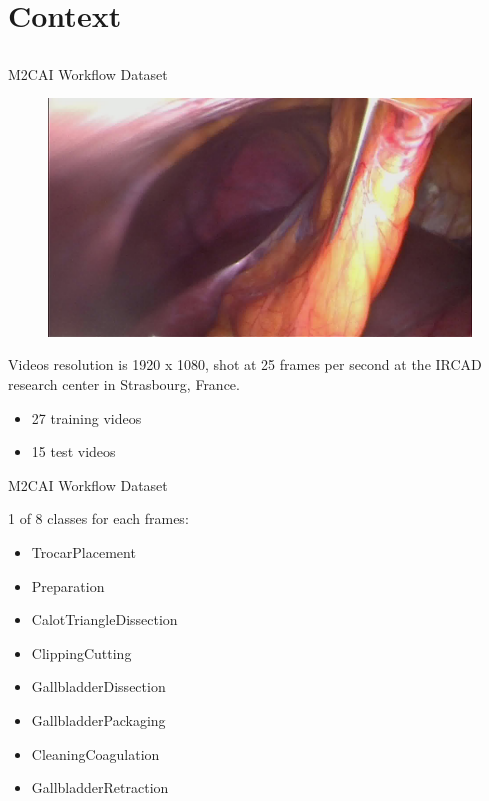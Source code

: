 \section{Context} \subsection{}\label{}

\begin{frame}{M2CAI Workflow Dataset}
	
		\begin{figure}
			\centering
			\includegraphics[width=.45\linewidth]{images/m2cai.jpg}
			\label{fig:2images}
		\end{figure}
	
	Videos resolution is 1920 x 1080, shot at 25 frames per second at the IRCAD research center in Strasbourg, France.
	
	\begin{itemize}
		\item 27 training videos %
		\item 15 test videos %
	\end{itemize}
	
\end{frame}

\begin{frame}{M2CAI Workflow Dataset}

	1 of 8 classes for each frames:
	\begin{itemize}
		\item TrocarPlacement
		\item Preparation
		\item CalotTriangleDissection
       	\item ClippingCutting
       	\item GallbladderDissection
       	\item GallbladderPackaging
       	\item CleaningCoagulation
       	\item GallbladderRetraction
    \end{itemize}

\end{frame}

